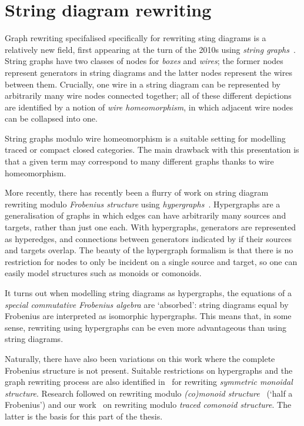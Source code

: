 \section{String diagram rewriting}

Graph rewriting specifalised specifically for rewriting sting diagrams is a
relatively new field, first appearing at the turn of the 2010s using
\emph{string graphs}~\cite{%
    dixon2010open,dixon2013opengraphs,kissinger2012pictures%
}.
String graphs have two classes of nodes for \emph{boxes} and \emph{wires}; the
former nodes represent generators in string diagrams and the latter nodes
represent the wires between them.
Crucially, one wire in a string diagram can be represented by arbitrarily
many wire nodes connected together; all of these different depictions are
identified by a notion of \emph{wire homeomorphism}, in which adjacent wire
nodes can be collapsed into one.

\begin{center}
\end{center}

String graphs modulo wire homeomorphism is a suitable setting for modelling
traced or compact closed categories.
The main drawback with this presentation is that a given term may correspond to
many different graphs thanks to wire homeomorphism.

More recently, there has recently been a flurry of work on string
diagram rewriting modulo \emph{Frobenius structure} using
\emph{hypergraphs}~\cite{%
    bonchi2016rewriting,zanasi2017rewriting,bonchi2017confluence,%
    bonchi2018rewriting,bonchi2022string,bonchi2022stringa,bonchi2022stringb%
}.
Hypergraphs are a generalisation of graphs in which edges can have arbitrarily
many sources and targets, rather than just one each.
With hypergraphs, generators are represented as hyperedges, and connections
between generators indicated by if their sources and targets overlap.
The beauty of the hypergraph formalism is that there is no restriction for
nodes to only be incident on a single source and target, so one can easily
model structures such as monoids or comonoids.

\begin{center}
\end{center}

It turns out when modelling string diagrams as hypergraphs, the equations of
a \emph{special commutative Frobenius algebra} are `absorbed': string diagrams
equal by Frobenius are interpreted as isomorphic hypergraphs.
This means that, in some sense, rewriting using hypergraphs can be even more
advantageous than using string diagrams.

Naturally, there have also been variations on this work where the complete
Frobenius structure is not present.
Suitable restrictions on hypergraphs and the graph rewriting process are also
identified in~\cite{bonchi2016rewriting} for rewriting
\emph{symmetric monoidal structure}.
Research followed on rewriting modulo
\emph{(co)monoid structure}~\cite{milosavljevic2023string} (`half a Frobenius')
and our work~\cite{ghica2023rewriting} on rewriting modulo
\emph{traced comonoid structure}.
The latter is the basis for this part of the thesis.